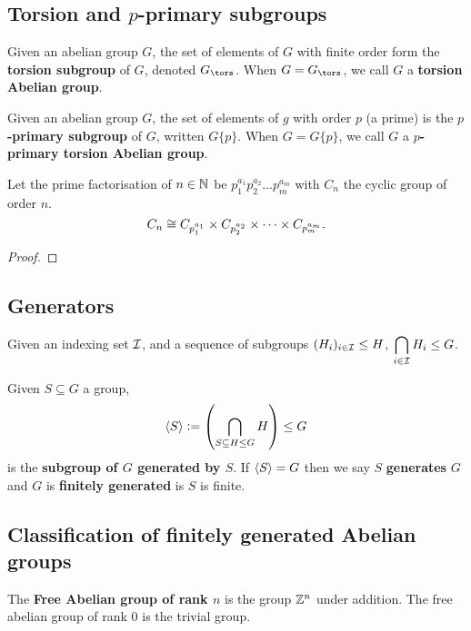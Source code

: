 \documentclass[../Year2.tex]{subfiles}
\begin{document}
\subsection{Torsion and $p$-primary subgroups}

\begin{definition}
    Given an abelian group $G$, the set of elements of $G$ with finite order form the \textbf{torsion subgroup} of $G$, denoted $G_{\tors}$. When $G=G_{\tors}$, we call $G$ a \textbf{torsion Abelian group}.
\end{definition}

\begin{definition}
    Given an abelian group $G$, the set of elements of $g$ with order $p$ (a prime) is the \textbf{$p$-primary subgroup} of $G$, written $G\{p\}$. When $G=G\{p\}$, we call $G$ a \textbf{$p$-primary torsion Abelian group}.
\end{definition}

\begin{theorem}
    Let the prime factorisation of $n\in\mathbb{N}$ be $p_1^{a_1}p_2^{a_2}\ldots p_m^{a_m}$ with $C_n$ the cyclic group of order $n$. \[
        C_n\cong C_{p_1^{a_1}}\times C_{p_2^{a_2}} \times \cdots \times C_{p_m^{a_m}}
    \text{\textcolor{black}{.}}
    \]
\vspace{-20pt}
    \begin{proof}
        
    \end{proof}
\end{theorem}

\subsection{Generators}

\begin{lemma}
    Given an indexing set $\mathcal{I}$, and a sequence of subgroups $(H_i)_{i\in\mathcal{I}}\leq H$, $\displaystyle \bigcap_{i\in\mathcal{I}}H_i\leq G$.
\end{lemma}

\begin{definition}
    Given $S\subseteq G$ a group,  \[
        \abr{S}:=\br{\bigcap_{S\subseteq H\leq G}H} \leq G
    \] is the \textbf{subgroup of $G$ generated by $S$}. If $\left\langle S \right\rangle=G$ then we say $S$ \textbf{generates} $G$ and $G$ is \textbf{finitely generated} is $S$ is finite.
\end{definition}

\subsection{Classification of finitely generated Abelian groups}
\begin{definition}
    The \textbf{Free Abelian group of rank $n$} is the group $\mathbb{Z}^n$ under addition. The free abelian group of rank 0 is the trivial group.
\end{definition}
\end{document}
